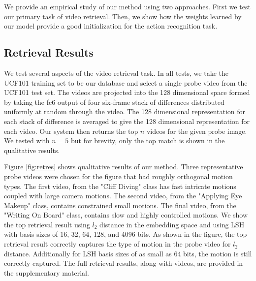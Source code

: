 We provide an empirical study of our method using two approaches. First we test our primary task of video retrieval. Then, we show how the weights learned by our model provide a good initialization for the action recognition task.

\subsection{Retrieval Results}

We test several aspects of the video retrieval task. In all tests, we take the UCF101 training set to be our database and select a single probe video from the UCF101 test set. The videos are projected into the 128 dimensional space formed by taking the fc6 output of four six-frame stack of differences distributed uniformly at random through the video. The 128 dimensional representation for each stack of difference is averaged to give the 128 dimensional representation for each video. Our system then returns the top $n$ videos for the given probe image. We tested with $n=5$ but for brevity, only the top match is shown in the qualitative results.

Figure \ref{fig:retres} shows qualitative results of our method. Three representative probe videos were chosen for the figure that had roughly orthogonal motion types. The first video, from the "Cliff Diving" class has fast intricate motions coupled with large camera motions. The second video, from the "Applying Eye Makeup" class, contains constrained small motions. The final video, from the "Writing On Board" class, contains slow and highly controlled motions. We show the top retrieval result using $l_2$ distance in the embedding space and using LSH with basis sizes of 16, 32, 64, 128, and 4096 bits. As shown in the figure, the top retrieval result correctly captures the type of motion in the probe video for $l_2$ distance. Additionally for LSH basis sizes of as small as 64 bits, the motion is still correctly captured. The full retrieval results, along with videos, are provided in the supplementary material.

